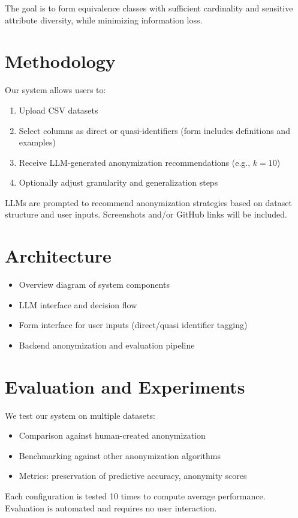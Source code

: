 \documentclass{article}
\begin{document}
The goal is to form equivalence classes with sufficient cardinality and sensitive attribute diversity, while minimizing information loss.


\section{Methodology}
Our system allows users to:
\begin{enumerate}
    \item Upload CSV datasets
    \item Select columns as direct or quasi-identifiers (form includes definitions and examples)
    \item Receive LLM-generated anonymization recommendations (e.g., $k=10$)
    \item Optionally adjust granularity and generalization steps
\end{enumerate}
LLMs are prompted to recommend anonymization strategies based on dataset structure and user inputs. Screenshots and/or GitHub links will be included.

\section{Architecture}
\begin{itemize}
    \item Overview diagram of system components
    \item LLM interface and decision flow
    \item Form interface for user inputs (direct/quasi identifier tagging)
    \item Backend anonymization and evaluation pipeline
\end{itemize}

\section{Evaluation and Experiments}
We test our system on multiple datasets:
\begin{itemize}
    \item Comparison against human-created anonymization
    \item Benchmarking against other anonymization algorithms
    \item Metrics: preservation of predictive accuracy, anonymity scores
\end{itemize}
Each configuration is tested 10 times to compute average performance. Evaluation is automated and requires no user interaction.
\end{document}
